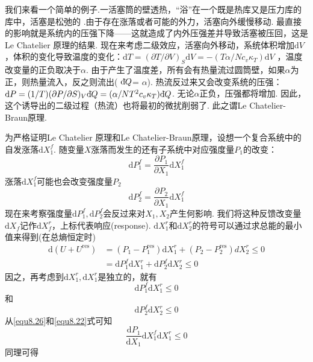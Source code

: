 我们来看一个简单的例子.一活塞筒的壁透热，“浴”在一个既是热库又是压力库的库中，活塞是松弛的%
%
.由于存在涨落或者可能的外力，活塞向外缓慢移动. 最直接的影响就是系统内的压强下降——这就造成了内外压强差并导致活塞被压回，这是Le Chatelier 原理的结果. 现在来考虑二级效应，活塞向外移动，系统体积增加$\text{d}V$，体积的变化导致温度的变化：$\text{d}T=(\partial T/\partial V)_S\text{d}V=-(T\alpha/Nc_v\kappa_T)\text{d}V$%
%
，温度改变量的正负取决于$\alpha$. 由于产生了温度差，所有会有热量流过圆筒壁，如果$\alpha$为正，则热量流入，反之则流出( $\mathrm d\hspace*{-0.1em}\bar{}\hspace*{0.08em} Q$= $\alpha$). 热流反过来又会改变系统的压强：$\text{d}P=(1/T)(\partial P/\partial S)_V\mathrm d\hspace*{-0.1em}\bar{}\hspace*{0.08em} Q=(\alpha/NT^2c_v\kappa_T)\mathrm d\hspace*{-0.1em}\bar{}\hspace*{0.08em} Q$.  无论$\alpha$正负，压强都将增加. 因此，这个诱导出的二级过程（热流）也将最初的微扰削弱了. 此之谓Le Chatelier-Braun原理.

为严格证明Le Chatelier 原理和Le Chatelier-Braun原理，设想一个复合系统中的自发涨落$\text{d}X^f_1 $. 随变量$X$涨落而发生的还有子系统中对应强度量$P_1$的改变：
\begin{equation}
\label{equ8.22}
\text{d}P_1^f= \frac{\partial P_1}{\partial X_1}\text{d}X_1^f 
\end{equation}
涨落$\text{d}X_1^f $可能也会改变强度量$P_2$
\begin{equation}
\label{equ8.23}
\text{d}P_2^f= \frac{\partial P_2}{\partial X_1}\text{d}X_1^f 
\end{equation}
现在来考察强度量$\text{d}P_1^f, \text{d}P_2^f$会反过来对$X_1, X_2$产生何影响. 我们将这种反馈改变量$\text{d}X_f $记作$\text{d}X_f^r$，上标代表响应(response). $\text{d}X_1^r$和$\text{d}X_2^r$的符号可以通过求总能的最小值来得到(在总熵恒定时)
\begin{eqnarray}
\label{equ8.24}
\text{d}(U+U^\text{res})&=(P_1-P_1^\text{res})\text{d}X_1^r+(P_2-P_2^\text{res}){d}X_2^r\leq 0\\
&=\text{d}P_1^f\text{d}X_1^r+\text{d}P_2^f\text{d}X_2^r\leq 0
\end{eqnarray}
因之，再考虑到$\text{d}X_1^r, \text{d}X_1^r$是独立的，就有
\begin{equation}
\label{equ8.26}
\text{d}P_1^f\text{d}X_1^r\leq 0
\end{equation}
和
\begin{equation}
\label{equ8.27}
\text{d}P_2^f\text{d}X_2^r\leq 0
\end{equation}
从\eqref{equ8.26}和\eqref{equ8.22}式可知
\begin{equation}
\label{equ8.28}
\frac{\text{d}P_1}{\text{d}X_1}\text{d}X_1^f\text{d}X_1^r\le 0
\end{equation}
同理可得

